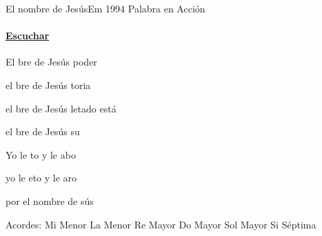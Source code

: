 \documentclass[12pt, spanish]{book}
\begin{document}
    \begin{song}{El nombre de Jesús}{Em}
    {1994} %
    {Palabra en Acción}
    {} %
    {}
        \ifChordBk
            \paragraph{\mbox{}\hfill\protect\href{https://open.spotify.com/intl-es/track/1nvOf7ZOl88YlKoDoJmrOs}{Escuchar}\mbox{}\hfill}
        \fi


        \begin{SBOpGroup}
            El bre de Jesús  poder

            el bre de Jesús toria 

            el bre de Jesús letado está

            el bre de Jesús su 
        \end{SBOpGroup}

        \begin{SBChorus}
            Yo le to y le abo

            yo le eto y le aro

            por el nombre de sús

              
        \end{SBChorus}

        \ifChordBk
        \begin{SBOpGroup}
            Acordes:\break
            \upchord{\Em}\qquad Mi Menor \hfill
            \upchord{\Am}\qquad La Menor \hfill\null\break
            \upchord{\D}\qquad Re Mayor \hfill
            \upchord{\C}\qquad Do Mayor \hfill
            \upchord{\G}\qquad Sol Mayor \hfill\null\break
            \upchord{\Bseven}\qquad Si S\'eptima \hfill\null\break
        \end{SBOpGroup}
        \fi
    \end{song}
\end{document}
